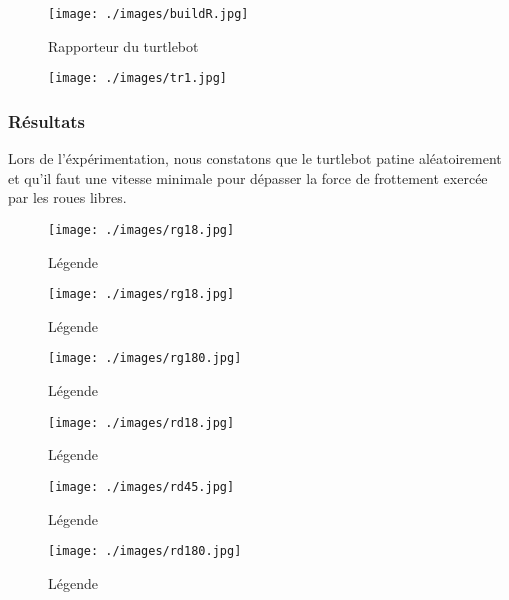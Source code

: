 \documentclass[12pt,french]{article}
\begin{document}
\begin{figure}[h]
    \begin{minipage}[c]{.46\linewidth}
        \centering
        \texttt{[image: ./images/buildR.jpg]}
        \caption{Rapporteur du turtlebot}
    \end{minipage}
    \hfill%
    \begin{minipage}[c]{.46\linewidth}
        \centering
        \texttt{[image: ./images/tr1.jpg]}
        \caption{}
    \end{minipage}
\end{figure}


\subsubsection{Résultats}

Lors de l'éxpérimentation, nous constatons que le turtlebot patine aléatoirement et qu'il faut une vitesse minimale pour dépasser la force de frottement exercée par les roues libres. \\


\begin{figure}[h]
    \begin{minipage}[c]{.46\linewidth}
        \centering
        \texttt{[image: ./images/rg18.jpg]}
        \caption{Légende}
    \end{minipage}
    \hfill%
    \begin{minipage}[c]{.46\linewidth}
        \centering
        \texttt{[image: ./images/rg18.jpg]}
        \caption{Légende}
    \end{minipage}
     \hfill%
    \begin{minipage}[c]{.46\linewidth}
        \centering
        \texttt{[image: ./images/rg180.jpg]}
        \caption{Légende}
    \end{minipage}
     \hfill%
    \begin{minipage}[c]{.46\linewidth}
        \centering
        \texttt{[image: ./images/rd18.jpg]}
        \caption{Légende}
    \end{minipage}
     \hfill%
    \begin{minipage}[c]{.46\linewidth}
        \centering
        \texttt{[image: ./images/rd45.jpg]}
        \caption{Légende}
    \end{minipage}
     \hfill%
    \begin{minipage}[c]{.46\linewidth}
        \centering
        \texttt{[image: ./images/rd180.jpg]}
        \caption{Légende}
    \end{minipage}
\end{figure}
\end{document}

